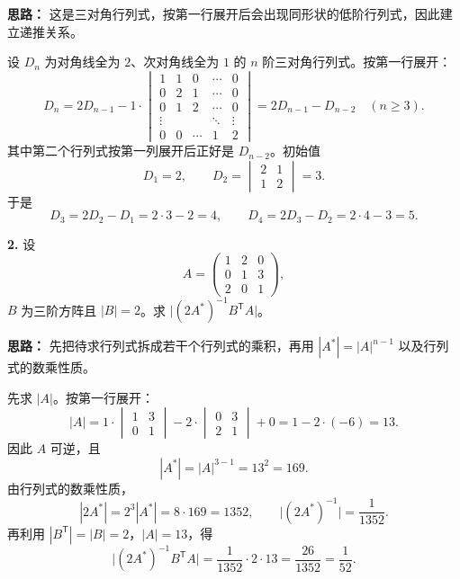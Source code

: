 \ifshowsolutions%
\textbf{思路：} 这是三对角行列式，按第一行展开后会出现同形状的低阶行列式，因此建立递推关系。

设 \(D_n\) 为对角线全为 \(2\)、次对角线全为 \(1\) 的 \(n\) 阶三对角行列式。按第一行展开：
\[
D_n=2D_{n-1}-1\cdot\begin{vmatrix}
1&1&0&\cdots&0\\
0&2&1&\cdots&0\\
0&1&2&\cdots&0\\
\vdots&&&\ddots&\vdots\\
0&0&\cdots&1&2
\end{vmatrix}
=2D_{n-1}-D_{n-2}\quad(n\ge3).
\]
其中第二个行列式按第一列展开后正好是 \(D_{n-2}\)。初始值
\[
D_1=2,\qquad D_2=\begin{vmatrix}2&1\\1&2\end{vmatrix}=3.
\]
于是
\[
D_3=2D_2-D_1=2\cdot3-2=4,\qquad
D_4=2D_3-D_2=2\cdot4-3=5.
\]
\else \answerarea[8] \fi%

\textbf{2.} 设
\[
A=\begin{pmatrix}1&2&0\\0&1&3\\2&0&1\end{pmatrix},
\]
\(B\) 为三阶方阵且 \(|B|=2\)。求 \(\bigl|(2A^*)^{-1}B^{\mathsf T}A\bigr|\)。

\ifshowsolutions%
\textbf{思路：} 先把待求行列式拆成若干个行列式的乘积，再用 \(|A^*|=|A|^{n-1}\) 以及行列式的数乘性质。

先求 \(|A|\)。按第一行展开：
\[
|A|=1\cdot\begin{vmatrix}1&3\\0&1\end{vmatrix}
-2\cdot\begin{vmatrix}0&3\\2&1\end{vmatrix}
+0
=1-2\cdot(-6)=13.
\]
因此 \(A\) 可逆，且
\[
|A^*|=|A|^{3-1}=13^2=169.
\]
由行列式的数乘性质，
\[
|2A^*|=2^3|A^*|=8\cdot169=1352,
\qquad
\bigl|(2A^*)^{-1}\bigr|=\frac1{1352}.
\]
再利用 \(|B^{\mathsf T}|=|B|=2\)，\(|A|=13\)，得
\[
\bigl|(2A^*)^{-1}B^{\mathsf T}A\bigr|
=\frac1{1352}\cdot2\cdot13
=\frac{26}{1352}
=\frac1{52}.
\]
\else \answerarea[8] \fi%

